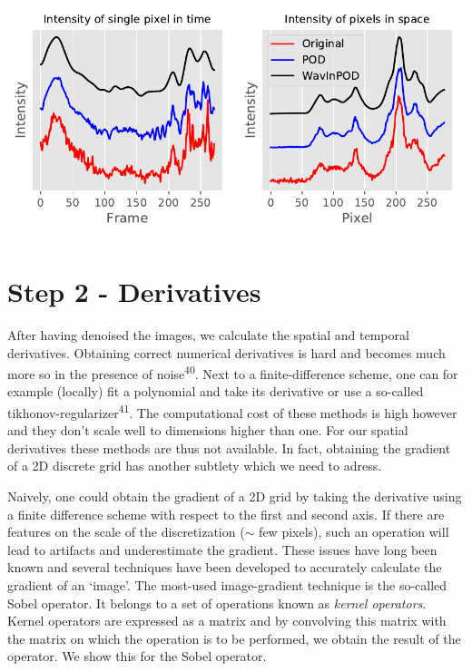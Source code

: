 \documentclass{Dissertate}
\let\origfigure\figure
\let\endorigfigure\endfigure
\renewenvironment{figure}[1][2] {
    \expandafter\origfigure\expandafter[H]
} {
    \endorigfigure
}
\begin{document}
\begin{figure}
\hypertarget{fig:filtered}{%
\centering
\includegraphics{source/figures/pdf/filtered.pdf}
\caption{Effect of POD with a cutoff of 27 and wavelet filtering with a
level 3 db4 wavelet. Left panel shows the result in the time domain,
right panel in the spatial domain. Lines have been offset for
clarity.}\label{fig:filtered}
}
\end{figure}

\hypertarget{step-2---derivatives}{%
\section{Step 2 - Derivatives}\label{step-2---derivatives}}

After having denoised the images, we calculate the spatial and temporal
derivatives. Obtaining correct numerical derivatives is hard and becomes
much more so in the presence of noise\textsuperscript{40}. Next to a
finite-difference scheme, one can for example (locally) fit a polynomial
and take its derivative or use a so-called
tikhonov-regularizer\textsuperscript{41}. The computational cost of
these methods is high however and they don't scale well to dimensions
higher than one. For our spatial derivatives these methods are thus not
available. In fact, obtaining the gradient of a 2D discrete grid has
another subtlety which we need to adress.

Naively, one could obtain the gradient of a 2D grid by taking the
derivative using a finite difference scheme with respect to the first
and second axis. If there are features on the scale of the
discretization (\(\sim\) few pixels), such an operation will lead to
artifacts and underestimate the gradient. These issues have long been
known and several techniques have been developed to accurately calculate
the gradient of an `image'. The most-used image-gradient technique is
the so-called Sobel operator. It belongs to a set of operations known as
\emph{kernel operators}. Kernel operators are expressed as a matrix and
by convolving this matrix with the matrix on which the operation is to
be performed, we obtain the result of the operator. We show this for the
Sobel operator.
\end{document}
